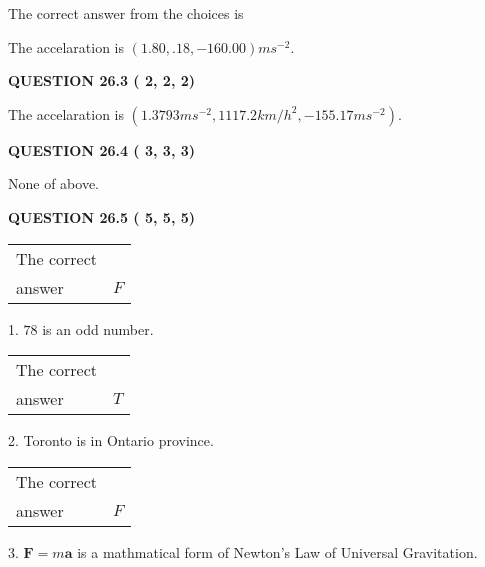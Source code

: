 \documentclass[12pt]{article}
\begin{document}
The correct answer from the choices is


The accelaration is $  %
(
1.80,
.18,
-160.00)
ms^{-2} $.
 
 
 
  
\vspace{0.2in}
  
{\textbf{\Large{QUESTION
26.3 
 (          2,          2,          2)
}}}
  
  
 
 
\noindent{}
 
 
The accelaration is
$(
1.3793ms^{-2},
1117.2km/h^2,
-155.17ms^{-2}
).
$
 
 
 
 
  
\vspace{0.2in}
  
{\textbf{\Large{QUESTION
26.4 
 (          3,          3,          3)
}}}
  
  
 
 
\noindent{}
 
 
 None of above.
 
 
 
 
  
\vspace{0.2in}
  
{\textbf{\Large{QUESTION
26.5 
 (          5,          5,          5)
}}}
  
  
 
 
\noindent{}

 
\noindent\begin{tabular}{|l|l|}\hline The correct & \\
          answer &  %
$F$ \\ \hline \end{tabular}
1. $ %
78$ is an  %
odd number.
 
\noindent\begin{tabular}{|l|l|}\hline The correct & \\
          answer &  %
$T$ \\ \hline \end{tabular}
2.  %
Toronto is in  %
Ontario province.
 
\noindent\begin{tabular}{|l|l|}\hline The correct & \\
          answer &  %
$F$ \\ \hline \end{tabular}
3.  %
$\mathbf{F}=m\mathbf{a}$ is a mathmatical form of  %
Newton's Law of Universal Gravitation.
 
\end{document}
